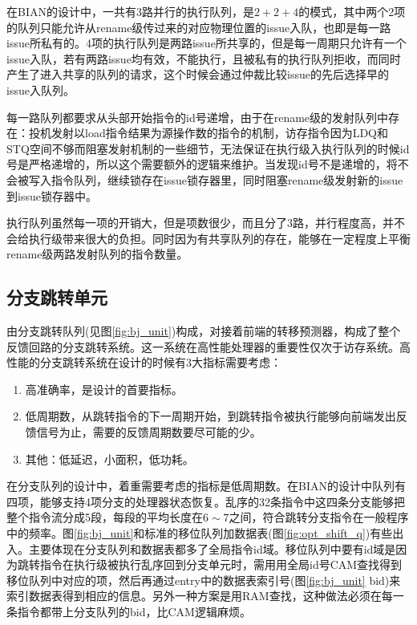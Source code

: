 在BIAN的设计中，一共有3路并行的执行队列，是$ 2 + 2 + 4 $的模式，其中两个2项的队列只能允许从rename级传过来的对应物理位置的issue入队，也即是每一路issue所私有的。4项的执行队列是两路issue所共享的，但是每一周期只允许有一个issue入队，若有两路issue均有效，不能执行，且被私有的执行队列拒收，而同时产生了进入共享的队列的请求，这个时候会通过仲裁比较issue的先后选择早的issue入队列。

每一路队列都要求从头部开始指令的id号递增，由于在rename级的发射队列中存在：投机发射以load指令结果为源操作数的指令的机制，访存指令因为LDQ和STQ空间不够而阻塞发射机制的一些细节，无法保证在执行级入执行队列的时候id号是严格递增的，所以这个需要额外的逻辑来维护。当发现id号不是递增的，将不会被写入指令队列，继续锁存在issue锁存器里，同时阻塞rename级发射新的issue到issue锁存器中。

执行队列虽然每一项的开销大，但是项数很少，而且分了3路，并行程度高，并不会给执行级带来很大的负担。同时因为有共享队列的存在，能够在一定程度上平衡rename级两路发射队列的指令数量。

\subsection{分支跳转单元}\label{subsec:bj_unit}

由分支跳转队列(见图\ref{fig:bj_unit})构成，对接着前端的转移预测器，构成了整个反馈回路的分支跳转系统。这一系统在高性能处理器的重要性仅次于访存系统。高性能的分支跳转系统在设计的时候有3大指标需要考虑：
\begin{enumerate}[label=(\alph*)]
	\item 高准确率，是设计的首要指标。
	\item 低周期数，从跳转指令的下一周期开始，到跳转指令被执行能够向前端发出反馈信号为止，需要的反馈周期数要尽可能的少。
	\item 其他：低延迟，小面积，低功耗。
\end{enumerate}

在分支队列的设计中，着重需要考虑的指标是低周期数。在BIAN的设计中队列有四项，能够支持4项分支的处理器状态恢复。乱序的32条指令中这四条分支能够把整个指令流分成5段，每段的平均长度在$6\sim7$之间，符合跳转分支指令在一般程序中的频率。图\ref{fig:bj_unit}和标准的移位队列加数据表(图\ref{fig:opt_shift_q})有些出入。主要体现在分支队列和数据表都多了全局指令id域。移位队列中要有id域是因为跳转指令在执行级被执行乱序回到分支单元时，需用用全局id号CAM查找得到移位队列中对应的项，然后再通过entry中的数据表索引号(图\ref{fig:bj_unit} bid)来索引数据表得到相应的信息。另外一种方案是用RAM查找，这种做法必须在每一条指令都带上分支队列的bid，比CAM逻辑麻烦。

